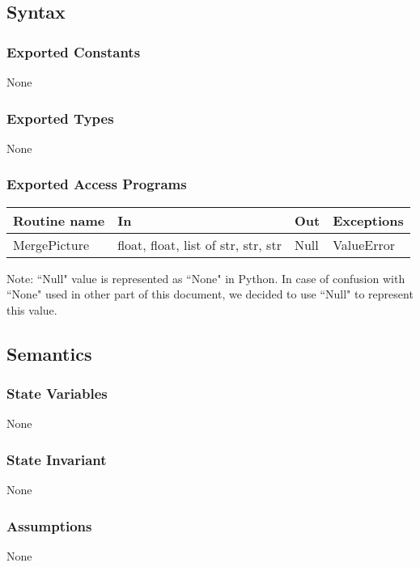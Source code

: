 \documentclass{article}
\begin{document}
\subsection {Syntax}

\subsubsection {Exported Constants}
None

\subsubsection {Exported Types}
None

\subsubsection {Exported Access Programs}
\begin{table}[!htbp]
\begin{tabular}{| l | l | l | l |}
\hline
\textbf{Routine name} & \textbf{In} & \textbf{Out} & \textbf{Exceptions}\\
\hline
MergePicture & float, float, list of str, str, str & Null & ValueError\\
\hline
\end{tabular}
\begin{tablenotes}
\small
  \item Note: ``Null" value is represented as ``None" in Python. In case of confusion with ``None" used in other part of this document, we decided to use ``Null" to represent this value.  
\end{tablenotes}
\end{table}
\FloatBarrier

\subsection {Semantics}

\subsubsection {State Variables}
None

\subsubsection {State Invariant}
None

\subsubsection {Assumptions}
None
\end{document}
